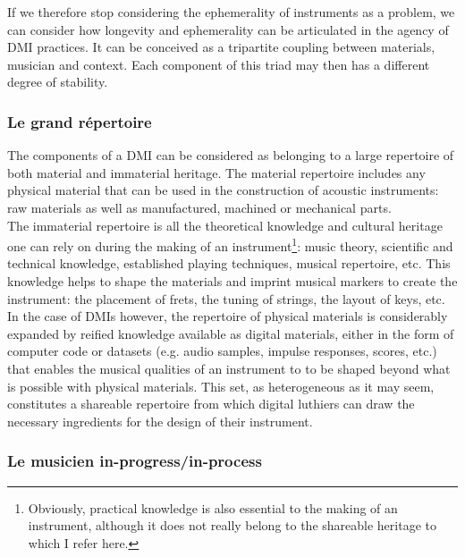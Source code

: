 If we therefore stop considering the ephemerality of instruments as a problem, we can consider how longevity and ephemerality can be articulated in the agency of DMI practices. It can be conceived as a tripartite coupling between materials, musician and context. Each component of this triad may then has a different degree of stability.

\subsubsection{Le grand répertoire}

The components of a DMI can be considered as belonging to a large repertoire of both material and immaterial heritage. The material repertoire includes any physical material that can be used in the construction of acoustic instruments: raw materials as well as manufactured, machined or mechanical parts. \\
\indent The immaterial repertoire is all the theoretical knowledge and cultural heritage one can rely on during the making of an instrument\footnote{Obviously, practical knowledge is also essential to the making of an instrument, although it does not really belong to the shareable heritage to which I refer here.}: music theory, scientific and technical knowledge, established playing techniques, musical repertoire, etc. This knowledge helps to shape the materials and imprint musical markers to create the instrument: the placement of frets, the tuning of strings, the layout of keys, etc.\\
\indent In the case of DMIs however, the repertoire of physical materials is considerably expanded by reified knowledge available as digital materials, either in the form of computer code or datasets (e.g. audio samples, impulse responses, scores, etc.) that enables the musical qualities of an instrument to to be shaped beyond what is possible with physical materials.
This set, as heterogeneous as it may seem, constitutes a shareable repertoire from which digital luthiers can draw the necessary ingredients for the design of their instrument.

\subsubsection{Le musicien in-progress/in-process}

